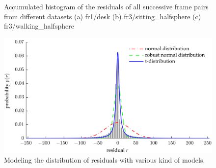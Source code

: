\documentclass[acmsmall, nonacm, 11pt]{acmart}
\begin{document}
\begin{figure}[h]
    \centering
    \caption{Accumulated histogram of the residuals of all successive frame pairs from different datasets \cite{kerl2012odometry} (a) fr1/desk (b) fr3/sitting\_halfsphere (c) fr3/walking\_halfsphere}
    \label{histo}
\end{figure}

\begin{figure}[h]
    \centering
    \includegraphics[width=\linewidth]{distribs.png}
    \caption{Modeling the distribution of residuals with various kind of models. \cite{kerl2012odometry}}
    \label{distribs}
\end{figure}
\end{document}
